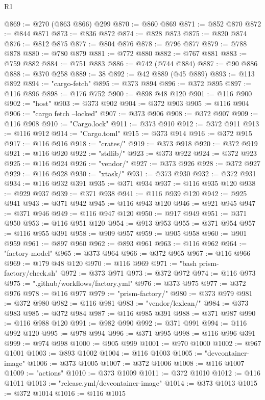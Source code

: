 \begin{lexlean}{R1}
\begin{coremodule}
@869 := @270 (@863 @866) @299
@870 := @860 @869
@871 := @852 @870
@872 := @844 @871
@873 := @836 @872
@874 := @828 @873
@875 := @820 @874
@876 := @812 @875
@877 := @804 @876
@878 := @796 @877
@879 := @788 @878
@880 := @780 @879
@881 := @772 @880
@882 := @767 @881
@883 := @759 @882
@884 := @751 @883
@886 := @742 (@744 @884)
@887 := @90 @886
@888 := @370 @258
@889 := 38
@892 := @42 @889 (@45 @889)
@893 := @113 @892
@894 := "cargo-fetch"
@895 := @373 @894
@896 := @372 @895
@897 := @116 @896
@898 := @176 @752
@900 := @898 @48 @120
@901 := @116 @900
@902 := "host"
@903 := @373 @902
@904 := @372 @903
@905 := @116 @904
@906 := "cargo fetch --locked"
@907 := @373 @906
@908 := @372 @907
@909 := @116 @908
@910 := "Cargo.lock"
@911 := @373 @910
@912 := @372 @911
@913 := @116 @912
@914 := "Cargo.toml"
@915 := @373 @914
@916 := @372 @915
@917 := @116 @916
@918 := "crates/"
@919 := @373 @918
@920 := @372 @919
@921 := @116 @920
@922 := "stdlib/"
@923 := @373 @922
@924 := @372 @923
@925 := @116 @924
@926 := "vendor/"
@927 := @373 @926
@928 := @372 @927
@929 := @116 @928
@930 := "xtask/"
@931 := @373 @930
@932 := @372 @931
@934 := @116 @932 @391
@935 := @371 @934
@937 := @116 @935 @120
@938 := @929 @937
@939 := @371 @938
@941 := @116 @939 @120
@942 := @925 @941
@943 := @371 @942
@945 := @116 @943 @120
@946 := @921 @945
@947 := @371 @946
@949 := @116 @947 @120
@950 := @917 @949
@951 := @371 @950
@953 := @116 @951 @120
@954 := @913 @953
@955 := @371 @954
@957 := @116 @955 @391
@958 := @909 @957
@959 := @905 @958
@960 := @901 @959
@961 := @897 @960
@962 := @893 @961
@963 := @116 @962
@964 := "factory-model"
@965 := @373 @964
@966 := @372 @965
@967 := @116 @966
@969 := @179 @48 @120
@970 := @116 @969
@971 := "bash prism-factory/check.sh"
@972 := @373 @971
@973 := @372 @972
@974 := @116 @973
@975 := ".github/workflows/factory.yml"
@976 := @373 @975
@977 := @372 @976
@978 := @116 @977
@979 := "prism-factory/"
@980 := @373 @979
@981 := @372 @980
@982 := @116 @981
@983 := "vendor/lexlean/"
@984 := @373 @983
@985 := @372 @984
@987 := @116 @985 @391
@988 := @371 @987
@990 := @116 @988 @120
@991 := @982 @990
@992 := @371 @991
@994 := @116 @992 @120
@995 := @978 @994
@996 := @371 @995
@998 := @116 @996 @391
@999 := @974 @998
@1000 := @905 @999
@1001 := @970 @1000
@1002 := @967 @1001
@1003 := @893 @1002
@1004 := @116 @1003
@1005 := "devcontainer-image"
@1006 := @373 @1005
@1007 := @372 @1006
@1008 := @116 @1007
@1009 := "actions"
@1010 := @373 @1009
@1011 := @372 @1010
@1012 := @116 @1011
@1013 := "release.yml/devcontainer-image"
@1014 := @373 @1013
@1015 := @372 @1014
@1016 := @116 @1015

\end{coremodule}
\end{lexlean}

